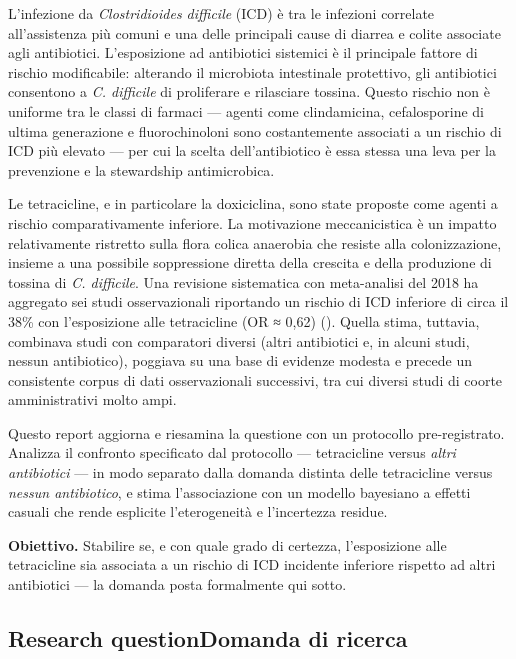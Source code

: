 \documentclass[
  letterpaper,
  DIV=11,
  numbers=noendperiod]{scrartcl}
\begin{document}
L'infezione da \emph{Clostridioides difficile} (ICD) è tra le infezioni
correlate all'assistenza più comuni e una delle principali cause di
diarrea e colite associate agli antibiotici. L'esposizione ad
antibiotici sistemici è il principale fattore di rischio modificabile:
alterando il microbiota intestinale protettivo, gli antibiotici
consentono a \emph{C. difficile} di proliferare e rilasciare tossina.
Questo rischio non è uniforme tra le classi di farmaci --- agenti come
clindamicina, cefalosporine di ultima generazione e fluorochinoloni sono
costantemente associati a un rischio di ICD più elevato --- per cui la
scelta dell'antibiotico è essa stessa una leva per la prevenzione e la
stewardship antimicrobica.

Le tetracicline, e in particolare la doxiciclina, sono state proposte
come agenti a rischio comparativamente inferiore. La motivazione
meccanicistica è un impatto relativamente ristretto sulla flora colica
anaerobia che resiste alla colonizzazione, insieme a una possibile
soppressione diretta della crescita e della produzione di tossina di
\emph{C. difficile}. Una revisione sistematica con meta-analisi del 2018
ha aggregato sei studi osservazionali riportando un rischio di ICD
inferiore di circa il 38\% con l'esposizione alle tetracicline (OR ≈
0,62) (). Quella stima,
tuttavia, combinava studi con comparatori diversi (altri antibiotici e,
in alcuni studi, nessun antibiotico), poggiava su una base di evidenze
modesta e precede un consistente corpus di dati osservazionali
successivi, tra cui diversi studi di coorte amministrativi molto ampi.

Questo report aggiorna e riesamina la questione con un protocollo
pre-registrato. Analizza il confronto specificato dal protocollo ---
tetracicline versus \emph{altri antibiotici} --- in modo separato dalla
domanda distinta delle tetracicline versus \emph{nessun antibiotico}, e
stima l'associazione con un modello bayesiano a effetti casuali che
rende esplicite l'eterogeneità e l'incertezza residue.

\textbf{Obiettivo.} Stabilire se, e con quale grado di certezza,
l'esposizione alle tetracicline sia associata a un rischio di ICD
incidente inferiore rispetto ad altri antibiotici --- la domanda posta
formalmente qui sotto.

\subsection{\texorpdfstring{{Research question}{Domanda di
ricerca}}{Research questionDomanda di ricerca}}\label{research-questiondomanda-di-ricerca}
\end{document}
